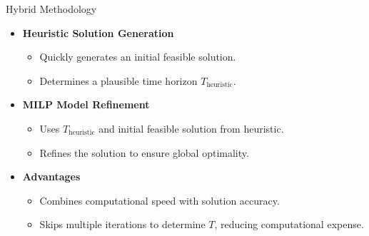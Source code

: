 \begin{frame}{Hybrid Methodology}
    \begin{itemize}
        \item \textbf{Heuristic Solution Generation}
            \begin{itemize}
                \item Quickly generates an initial feasible solution.
                \item Determines a plausible time horizon $T_{\text{heuristic}}$.
            \end{itemize}
        \item \textbf{MILP Model Refinement}
            \begin{itemize}
                \item Uses $T_{\text{heuristic}}$ and initial feasible solution from heuristic.
                \item Refines the solution to ensure global optimality.
            \end{itemize}
        \item \textbf{Advantages}
            \begin{itemize}
                \item Combines computational speed with solution accuracy.
                \item Skips multiple iterations to determine $T$, reducing computational expense.
            \end{itemize}
    \end{itemize}
\end{frame}

